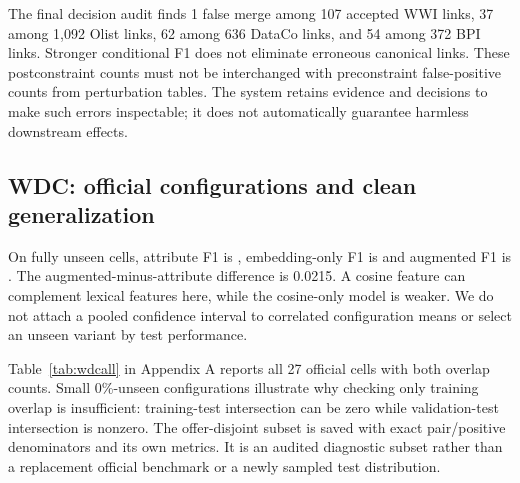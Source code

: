 \documentclass[11pt,letterpaper]{article}
\begin{document}
\begin{table}[t]\centering\small
\caption{Clean graph-method links accepted after one-to-one constraints, summed across seed trials. Repeated seeds reuse source populations; counts are trial outcomes, not independent production events.}\label{tab:identity}\end{table}
The final decision audit finds 1 false merge among 107 accepted WWI links, 37 among 1,092 Olist links, 62 among 636 DataCo links, and 54 among 372 BPI links. Stronger conditional F1 does not eliminate erroneous canonical links. These postconstraint counts must not be interchanged with preconstraint false-positive counts from perturbation tables. The system retains evidence and decisions to make such errors inspectable; it does not automatically guarantee harmless downstream effects.

\subsection{WDC: official configurations and clean generalization}
\begin{table}[t]\centering\small
\caption{Descriptive mean F1 over nine fully unseen configurations and three training seeds. Development sizes reuse test pools; the 27 observations per method are not independent samples.}\label{tab:wdcmean}\end{table}
On fully unseen cells, attribute F1 is \WdcAttr{}, embedding-only F1 is \WdcEmb{} and augmented F1 is \WdcAug{}. The augmented-minus-attribute difference is 0.0215. A cosine feature can complement lexical features here, while the cosine-only model is weaker. We do not attach a pooled confidence interval to correlated configuration means or select an unseen variant by test performance.

Table~\ref{tab:wdcall} in Appendix A reports all 27 official cells with both overlap counts. Small 0\%-unseen configurations illustrate why checking only training overlap is insufficient: training-test intersection can be zero while validation-test intersection is nonzero. The offer-disjoint subset is saved with exact pair/positive denominators and its own metrics. It is an audited diagnostic subset rather than a replacement official benchmark or a newly sampled test distribution.
\end{document}
